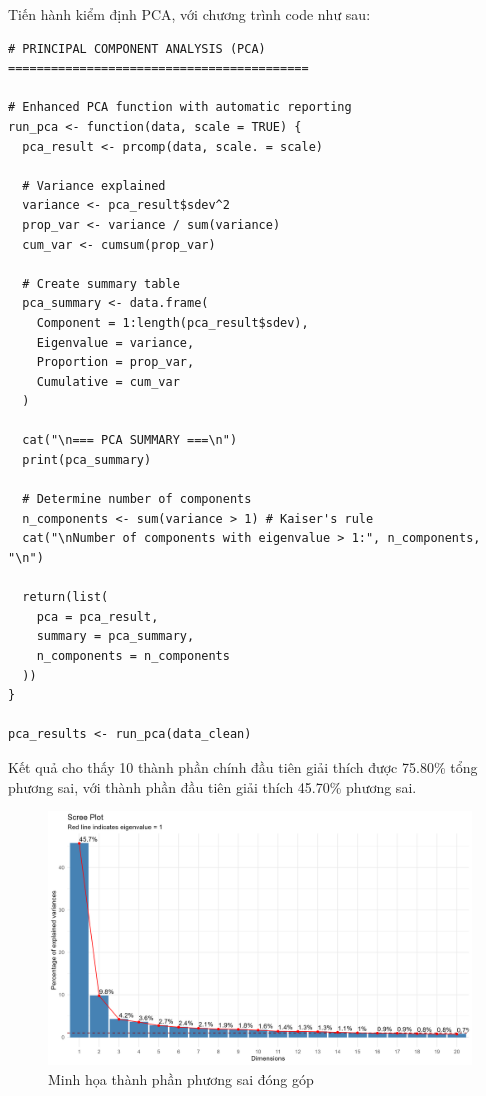 Tiến hành kiểm định PCA, với chương trình code như sau:
\begin{lstlisting}
# PRINCIPAL COMPONENT ANALYSIS (PCA) ==========================================

# Enhanced PCA function with automatic reporting
run_pca <- function(data, scale = TRUE) {
  pca_result <- prcomp(data, scale. = scale)
  
  # Variance explained
  variance <- pca_result$sdev^2
  prop_var <- variance / sum(variance)
  cum_var <- cumsum(prop_var)
  
  # Create summary table
  pca_summary <- data.frame(
    Component = 1:length(pca_result$sdev),
    Eigenvalue = variance,
    Proportion = prop_var,
    Cumulative = cum_var
  )
  
  cat("\n=== PCA SUMMARY ===\n")
  print(pca_summary)
  
  # Determine number of components
  n_components <- sum(variance > 1) # Kaiser's rule
  cat("\nNumber of components with eigenvalue > 1:", n_components, "\n")
  
  return(list(
    pca = pca_result,
    summary = pca_summary,
    n_components = n_components
  ))
}

pca_results <- run_pca(data_clean)
\end{lstlisting}

Kết quả cho thấy 10 thành phần chính đầu tiên giải thích được 75.80\% tổng phương sai, với thành phần đầu tiên giải thích 45.70\% phương sai.

\begin{figure}[h!]
    \includegraphics[width=\textwidth]{../../assets/images/SP42.png}
    \caption{Minh họa thành phần phương sai đóng góp}
    \label{fig:scree_plot}
\end{figure}

